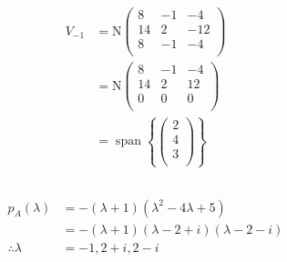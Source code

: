 \documentclass[fleqn, a4paper, draft]{amsart}
\DeclareMathOperator{\vspan}{\mathrm{span}} %
\theoremstyle{definition}
\theoremstyle{theorem}
\theoremstyle{remark}
\newcommand{\N}{\mathrm{N}}
\numberwithin{corollary}{theorem}
\numberwithin{equation}{theorem}
\begin{document}
\begin{align*}
	V_{-1} &= \N
		\begin{pmatrix}
			8 & -1 & -4\\
			14 & 2 & -12\\
			8 & -1 & -4\\
		\end{pmatrix}\\
	&= \N
		\begin{pmatrix}
			8 & -1 & -4\\
			14 & 2 & 12\\
			0 & 0 & 0\\
		\end{pmatrix}\\
	&= \vspan
		\left\lbrace
			\begin{pmatrix}
				2\\
				4\\
				3\\
			\end{pmatrix}
		\right\rbrace
\end{align*}

\subsection{}

\begin{align*}
	p_A(\lambda) &= -(\lambda + 1)(\lambda^2 - 4 \lambda + 5)\\
	&= -(\lambda + 1)(\lambda - 2 + i)(\lambda - 2 - i)\\
	\therefore \lambda &= -1, 2 + i, 2 - i
\end{align*}
\end{document}
